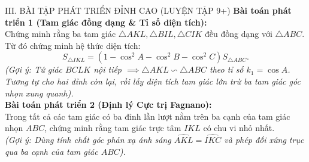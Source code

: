 \documentclass[11pt,a4paper]{article}
\begin{document}
\vspace{1mm}

\begin{exercisebox}{III. BÀI TẬP PHÁT TRIỂN ĐỈNH CAO (LUYỆN TẬP 9+)}
\textbf{Bài toán phát triển 1 (Tam giác đồng dạng \& Tỉ số diện tích):}\\
Chứng minh rằng ba tam giác $\triangle AKL, \triangle B I L, \triangle CIK$ đều đồng dạng với $\triangle ABC$. Từ đó chứng minh hệ thức diện tích:
\[
S_{\triangle IKL} = \left(1 - \cos^2 A - \cos^2 B - \cos^2 C\right) S_{\triangle ABC}.
\]
\textit{(Gợi ý: Tứ giác $BCLK$ nội tiếp $\implies \triangle AKL \backsim \triangle ABC$ theo tỉ số $k_1 = \cos A$. Tương tự cho hai đỉnh còn lại, rồi lấy diện tích tam giác lớn trừ ba tam giác góc nhọn xung quanh).}\\[2mm]
\textbf{Bài toán phát triển 2 (Định lý Cực trị Fagnano):}\\
Trong tất cả các tam giác có ba đỉnh lần lượt nằm trên ba cạnh của tam giác nhọn $ABC$, chứng minh rằng tam giác trực tâm $IKL$ có chu vi nhỏ nhất.\\[1mm]
\textit{(Gợi ý: Dùng tính chất góc phản xạ ánh sáng $\widehat{AKL} = \widehat{IKC}$ và phép đối xứng trục qua ba cạnh của tam giác $ABC$).}
\end{exercisebox}
\end{document}
